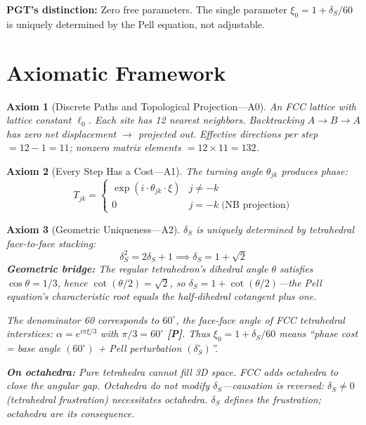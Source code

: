 \documentclass[11pt,a4paper]{article}
\newtheorem{axiom}{Axiom}
\newcommand{\gradeP}{\textbf{[P]}}
\begin{document}
\textbf{PGT's distinction:} Zero free parameters. The single parameter $\xi_0 = 1+\delta_S/60$ is uniquely determined by the Pell equation, not adjustable.

\section{Axiomatic Framework}\label{sec:axioms}

\begin{axiom}[Discrete Paths and Topological Projection---A0]
An FCC lattice with lattice constant $\ell_0$. Each site has 12 nearest neighbors. Backtracking $A\to B\to A$ has zero net displacement $\to$ projected out. Effective directions per step $= 12-1=11$; nonzero matrix elements $= 12\times 11 = 132$.
\end{axiom}

\begin{axiom}[Every Step Has a Cost---A1]
The turning angle $\theta_{jk}$ produces phase:
$$T_{jk} = \begin{cases} \exp(i\cdot\theta_{jk}\cdot\xi) & j\neq -k \\ 0 & j=-k \;\text{(NB projection)} \end{cases}$$
\end{axiom}

\begin{axiom}[Geometric Uniqueness---A2]
$\delta_S$ is uniquely determined by tetrahedral face-to-face stacking:
$$\delta_S^2 = 2\delta_S + 1 \implies \delta_S = 1+\sqrt{2}$$
\textbf{Geometric bridge:} The regular tetrahedron's dihedral angle $\theta$ satisfies $\cos\theta = 1/3$, hence $\cot(\theta/2) = \sqrt{2}$, so $\delta_S = 1 + \cot(\theta/2)$---the Pell equation's characteristic root equals the half-dihedral cotangent plus one.

The denominator 60 corresponds to $60^\circ$, the face-face angle of FCC tetrahedral interstices: $\alpha = e^{i\pi\xi/3}$ with $\pi/3 = 60^\circ$ \gradeP. Thus $\xi_0 = 1 + \delta_S/60$ means ``phase cost = base angle $(60^\circ)$ + Pell perturbation $(\delta_S^\circ)$''.

\textbf{On octahedra:} Pure tetrahedra cannot fill 3D space. FCC adds octahedra to close the angular gap. Octahedra do not modify $\delta_S$---causation is reversed: $\delta_S \neq 0$ (tetrahedral frustration) \emph{necessitates} octahedra. $\delta_S$ defines the frustration; octahedra are its consequence.
\end{axiom}
\end{document}
